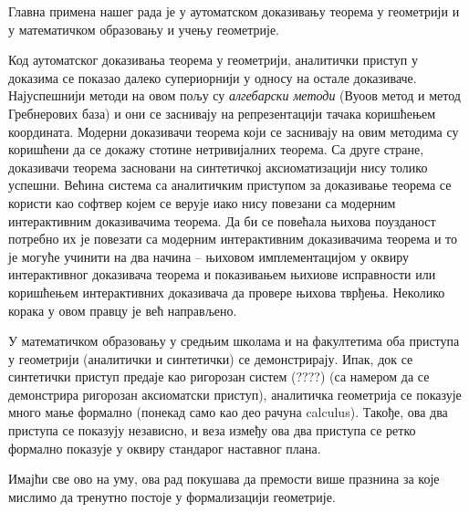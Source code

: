\documentclass[a4paper, 12pt]{article}
\begin{document}
Главна примена нашег рада је у аутоматском доказивању теорема у
геометрији и у математичком образовању и учењу геометрије.

Код аутоматског доказивања теорема у геометрији, аналитички приступ у
доказима се показао далеко супериорнији у односу на остале
доказиваче. Најуспешнији методи на овом пољу су \emph{алгебарски
  методи} (Вуоов метод\cite{wu} и метод Гребнерових
база\cite{buchberger,kapur}) и они се заснивају на репрезентацији
тачака коришћењем координата. Модерни доказивачи теорема који се
заснивају на овим методима су коришћени да се докажу стотине
нетривијалних теорема. Са друге стране, доказивачи теорема засновани
на синтетичкој аксиоматизацији нису толико успешни. Већина система са
аналитичким приступом за доказивање теорема се користи као софтвер
којем се верује иако нису повезани са модерним интерактивним
доказивачима теорема. Да би се повећала њихова поузданост потребно их
је повезати са модерним интерактивним доказивачима теорема и то је
могуће учинити на два начина -- њиховом имплементацијом у оквиру
интерактивног доказивача теорема и показивањем њихиове исправности или
коришћењем интерактивних доказивача да провере њихова
тврђења. Неколико корака у овом правцу је већ
направљено\cite{wucoq,thedu}.

У математичком образовању у средњим школама и на факултетима оба
приступа у геометрији (аналитички и синтетички) се
демонстрирају. Ипак, док се синтетички приступ предаје као ригорозан
систем (????) (са намером да се демонстрира ригорозан аксиоматски
приступ), аналитичка геометрија се показује много мање формално
(понекад само као део рачуна {\lat calculus}).  Такође, ова два
приступа се показују независно, и веза између ова два приступа се
ретко формално показује у оквиру стандарог наставног плана.

Имајћи све ово на уму, ова рад покушава да премости више празнина за које мислимо да
тренутно постоје у формализацији геометрије.
\end{document}
